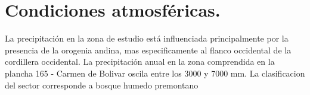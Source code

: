 \section{Condiciones atmosf\'{e}ricas.}
La precipitaci\'{o}n en la zona de estudio est\'{a} influenciada principalmente por la presencia de la orogenia andina, mas especificamente al flanco occidental de la cordillera occidental. La precipitaci\'{o}n anual en la zona comprendida en la plancha 165 - Carmen de Bolivar oscila entre los 3000 y 7000 mm. \cite{precipitacion} La clasificacion del sector corresponde a bosque humedo premontano \cite{bosque}

